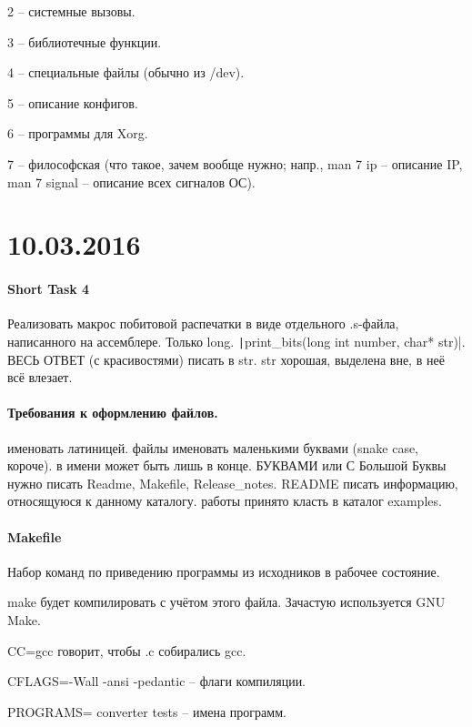 \documentclass[a4paper,10pt]{article}
\newcommand{\ci}{\texttt}
\begin{document}
2 -- системные вызовы.

3 -- библиотечные функции.

4 -- специальные файлы (обычно из /dev).

5 -- описание конфигов.

6 -- программы для Xorg.

7 -- философская (что такое, зачем вообще нужно; напр., man 7 ip -- описание IP, man 7 signal -- описание всех сигналов ОС).

\section{10.03.2016}
\paragraph{Short Task 4}

Реализовать макрос побитовой распечатки в виде отдельного .s-файла, написанного на ассемблере.
Только long.
\ci|print_bits(long int number, char* str)|. ВЕСЬ ОТВЕТ (с красивостями) писать в str. str хорошая, выделена вне, в неё всё влезает.

\paragraph{Требования к оформлению файлов.}

\begin{enumerate}
 именовать латиницей.
 файлы именовать маленькими буквами (snake case, короче).
 в имени может быть лишь в конце.
 БУКВАМИ или С Большой Буквы нужно писать Readme, Makefile, Release\_notes.
 README писать информацию, относящуюся к данному каталогу.
 работы принято класть в каталог examples.
\end{enumerate}
\paragraph{Makefile}

Набор команд по приведению программы из исходников в рабочее состояние.

make будет компилировать с учётом этого файла. Зачастую используется GNU Make.

CC=gcc говорит, чтобы .c собирались gcc.

CFLAGS=-Wall -ansi -pedantic -- флаги компиляции.

PROGRAMS= converter tests -- имена программ.
\end{document}
